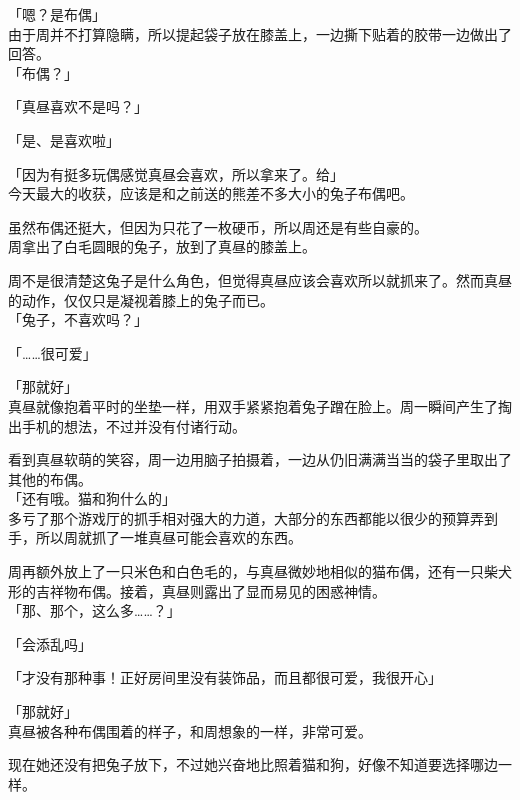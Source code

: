 「嗯？是布偶」\\

由于周并不打算隐瞒，所以提起袋子放在膝盖上，一边撕下贴着的胶带一边做出了回答。\\

「布偶？」

「真昼喜欢不是吗？」

「是、是喜欢啦」

「因为有挺多玩偶感觉真昼会喜欢，所以拿来了。给」\\

今天最大的收获，应该是和之前送的熊差不多大小的兔子布偶吧。

虽然布偶还挺大，但因为只花了一枚硬币，所以周还是有些自豪的。\\

周拿出了白毛圆眼的兔子，放到了真昼的膝盖上。

周不是很清楚这兔子是什么角色，但觉得真昼应该会喜欢所以就抓来了。然而真昼的动作，仅仅只是凝视着膝上的兔子而已。\\

「兔子，不喜欢吗？」

「……很可爱」

「那就好」\\

真昼就像抱着平时的坐垫一样，用双手紧紧抱着兔子蹭在脸上。周一瞬间产生了掏出手机的想法，不过并没有付诸行动。

看到真昼软萌的笑容，周一边用脑子拍摄着，一边从仍旧满满当当的袋子里取出了其他的布偶。\\

「还有哦。猫和狗什么的」\\

多亏了那个游戏厅的抓手相对强大的力道，大部分的东西都能以很少的预算弄到手，所以周就抓了一堆真昼可能会喜欢的东西。

周再额外放上了一只米色和白色毛的，与真昼微妙地相似的猫布偶，还有一只柴犬形的吉祥物布偶。接着，真昼则露出了显而易见的困惑神情。\\

「那、那个，这么多……？」

「会添乱吗」

「才没有那种事！正好房间里没有装饰品，而且都很可爱，我很开心」

「那就好」\\

真昼被各种布偶围着的样子，和周想象的一样，非常可爱。

现在她还没有把兔子放下，不过她兴奋地比照着猫和狗，好像不知道要选择哪边一样。\\

